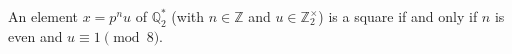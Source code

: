 An element $x = p^n u$ of $\mathbb{Q}_2^*$ (with $n \in \mathbb{Z}$ and $u \in \mathbb{Z}_2^\times$) is a square if and only if $n$ is even and $u \equiv 1 \pmod{8}$.
